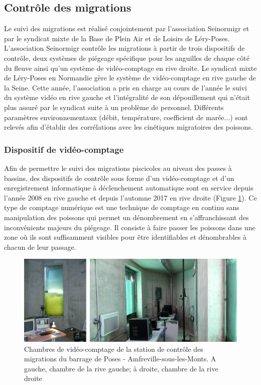 \documentclass[11pt,titlepage,twoside]{article}\usepackage[]{graphicx}\usepackage[table]{xcolor}
\begin{document}
\subsection{Contrôle des migrations}

Le suivi des migrations est réalisé conjointement par l'association Seinormigr et par le syndicat mixte de la Base de Plein Air et de Loisirs de Léry-Poses.
L'association Seinormigr contrôle les migrations à partir de trois dispositifs de contrôle, deux systèmes de piégeage spécifique pour les anguilles de chaque côté du fleuve ainsi qu'un système de vidéo-comptage en rive droite. Le syndicat mixte de Léry-Poses en Normandie gère le système de vidéo-comptage en rive gauche de la Seine.
Cette année, l'association a pris en charge au cours de l'année le suivi du système vidéo en rive gauche et l'intégralité de son dépouillement qui n'était plus assuré par le syndicat suite à un problème de personnel.
Différents paramètres environnementaux (débit, température, coefficient de marée...) sont relevés afin d'établir des corrélations avec les cinétiques migratoires des poissons.

\subsubsection{Dispositif de vidéo-comptage}

Afin de permettre le suivi des migrations piscicoles au niveau des passes à bassins, des dispositifs de contrôle sous forme d'un vidéo-comptage et d'un enregistrement informatique à déclenchement automatique sont en service depuis l'année 2008 en rive gauche et depuis l'automne 2017 en rive droite (Figure \ref{chambre_vc_poses}). Ce type de comptage numérique est une technique de comptage en continu sans manipulation des poissons qui permet un dénombrement en s'affranchissant des inconvénients majeurs du piégeage. Il consiste à faire passer les poissons dans une zone où ils sont suffisamment visibles pour être identifiables et dénombrables à chacun de leur passage.

\begin{figure}
\centering
\includegraphics[width=\textwidth]{chambre_vc_poses}
\caption{Chambres de vidéo-comptage de la station de contrôle des migrations du barrage de Poses - Amfreville-sous-les-Monts. A gauche, chambre de la rive gauche; à droite, chambre de la rive droite}
\label{chambre_vc_poses}
\end{figure}
\end{document}
